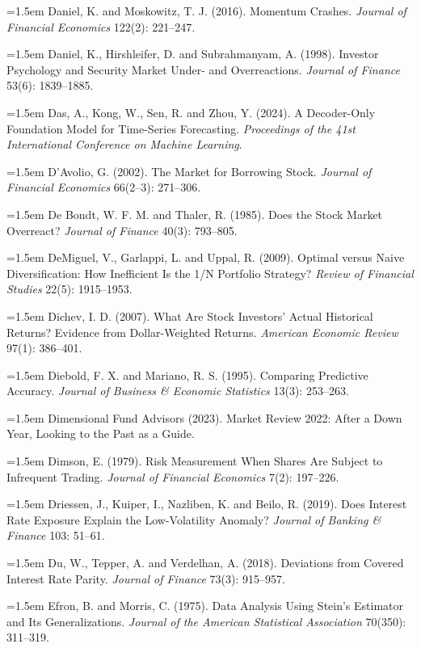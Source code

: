 \hangindent=1.5em Daniel, K. and Moskowitz, T. J. (2016). Momentum Crashes. \emph{Journal of Financial Economics} 122(2): 221--247.

\hangindent=1.5em Daniel, K., Hirshleifer, D. and Subrahmanyam, A. (1998). Investor Psychology and Security Market Under- and Overreactions. \emph{Journal of Finance} 53(6): 1839--1885.

\hangindent=1.5em Das, A., Kong, W., Sen, R. and Zhou, Y. (2024). A Decoder-Only Foundation Model for Time-Series Forecasting. \emph{Proceedings of the 41st International Conference on Machine Learning}.

\hangindent=1.5em D'Avolio, G. (2002). The Market for Borrowing Stock. \emph{Journal of Financial Economics} 66(2--3): 271--306.

\hangindent=1.5em De Bondt, W. F. M. and Thaler, R. (1985). Does the Stock Market Overreact? \emph{Journal of Finance} 40(3): 793--805.

\hangindent=1.5em DeMiguel, V., Garlappi, L. and Uppal, R. (2009). Optimal versus Naive Diversification: How Inefficient Is the 1/N Portfolio Strategy? \emph{Review of Financial Studies} 22(5): 1915--1953.

\hangindent=1.5em Dichev, I. D. (2007). What Are Stock Investors' Actual Historical Returns? Evidence from Dollar-Weighted Returns. \emph{American Economic Review} 97(1): 386--401.

\hangindent=1.5em Diebold, F. X. and Mariano, R. S. (1995). Comparing Predictive Accuracy. \emph{Journal of Business \& Economic Statistics} 13(3): 253--263.

\hangindent=1.5em Dimensional Fund Advisors (2023). Market Review 2022: After a Down Year, Looking to the Past as a Guide.

\hangindent=1.5em Dimson, E. (1979). Risk Measurement When Shares Are Subject to Infrequent Trading. \emph{Journal of Financial Economics} 7(2): 197--226.

\hangindent=1.5em Driessen, J., Kuiper, I., Nazliben, K. and Beilo, R. (2019). Does Interest Rate Exposure Explain the Low-Volatility Anomaly? \emph{Journal of Banking \& Finance} 103: 51--61.

\hangindent=1.5em Du, W., Tepper, A. and Verdelhan, A. (2018). Deviations from Covered Interest Rate Parity. \emph{Journal of Finance} 73(3): 915--957.

\hangindent=1.5em Efron, B. and Morris, C. (1975). Data Analysis Using Stein's Estimator and Its Generalizations. \emph{Journal of the American Statistical Association} 70(350): 311--319.

